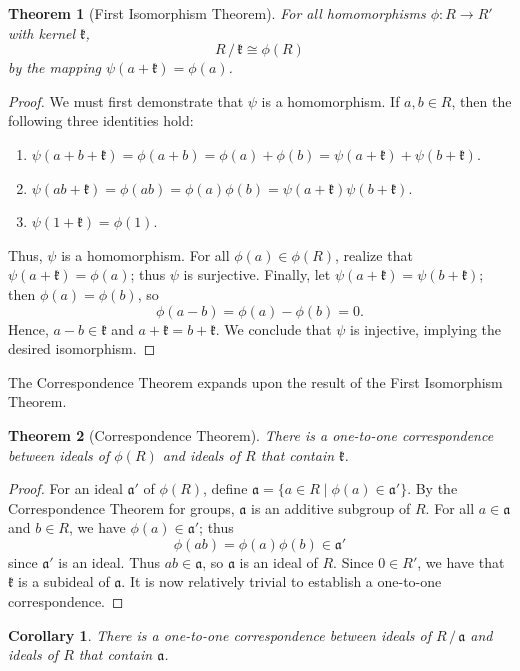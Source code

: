 \documentclass[11pt]{article}
\newtheorem{theorem}{Theorem}
\newtheorem{corollary}{Corollary}
\begin{document}
\begin{adjustwidth}{0.5cm}{}
	\begin{theorem}[First Isomorphism Theorem]
		For all homomorphisms $\phi : R \to R'$ with kernel $\mathfrak{k}$,
		\[
			R \,/\, \mathfrak{k} \cong \phi(R)
		\]
		by the mapping $\psi(a + \mathfrak{k}) = \phi(a)$.
	\end{theorem}
	\begin{proof}
		We must first demonstrate that $\psi$ is a homomorphism. If $a, b \in R$, then the following three identities hold:
		\begin{enumerate}
			\item $\psi(a + b + \mathfrak{k}) = \phi(a + b) = \phi(a) + \phi(b) = \psi(a + \mathfrak{k}) + \psi(b + \mathfrak{k})$.
			\item $\psi(ab + \mathfrak{k}) = \phi(ab) = \phi(a) \phi(b) = \psi(a + \mathfrak{k}) \psi(b + \mathfrak{k})$.
			\item $\psi(1 + \mathfrak{k}) = \phi(1)$.
		\end{enumerate}
		Thus, $\psi$ is a homomorphism. For all $\phi(a) \in \phi(R)$, realize that $\psi(a + \mathfrak{k}) = \phi(a)$; thus $\psi$ is surjective. Finally, let $\psi(a + \mathfrak{k}) = \psi(b + \mathfrak{k})$; then $\phi(a) = \phi(b)$, so
		\[
			\phi(a - b) = \phi(a) - \phi(b) = 0.
		\]
		Hence, $a - b \in \mathfrak{k}$ and $a + \mathfrak{k} = b + \mathfrak{k}$. We conclude that $\psi$ is injective, implying the desired isomorphism.
	\end{proof}
\end{adjustwidth}

The Correspondence Theorem expands upon the result of the First Isomorphism Theorem.

\begin{adjustwidth}{0.5cm}{}
	\begin{theorem}[Correspondence Theorem]
		There is a one-to-one correspondence between ideals of $\phi(R)$ and ideals of $R$ that contain $\mathfrak{k}$.
	\end{theorem}
	\begin{proof}
		For an ideal $\mathfrak{a}'$ of $\phi(R)$, define $\mathfrak{a} = \{ a \in R \mid \phi(a) \in \mathfrak{a}' \}$. By the Correspondence Theorem for groups, $\mathfrak{a}$ is an additive subgroup of $R$. For all $a \in \mathfrak{a}$ and $b \in R$, we have $\phi(a) \in \mathfrak{a}'$; thus
		\[
			\phi(ab) = \phi(a) \phi(b) \in \mathfrak{a}'
		\]
		since $\mathfrak{a}'$ is an ideal. Thus $ab \in \mathfrak{a}$, so $\mathfrak{a}$ is an ideal of $R$. Since $0 \in R'$, we have that $\mathfrak{k}$ is a subideal of $\mathfrak{a}$. It is now relatively trivial to establish a one-to-one correspondence.
	\end{proof}
	\begin{corollary}
		There is a one-to-one correspondence between ideals of $R \,/\, \mathfrak{a}$ and ideals of $R$ that contain $\mathfrak{a}$.
	\end{corollary}
\end{adjustwidth}
\end{document}
